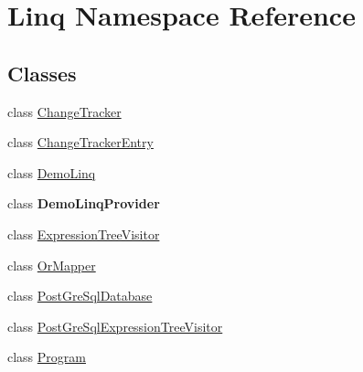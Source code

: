 \hypertarget{namespace_linq}{}\section{Linq Namespace Reference}
\label{namespace_linq}
\subsection*{Classes}
\begin{DoxyCompactItemize}
\item 
class \mbox{\hyperlink{class_linq_1_1_change_tracker}{Change\+Tracker}}
\item 
class \mbox{\hyperlink{class_linq_1_1_change_tracker_entry}{Change\+Tracker\+Entry}}
\item 
class \mbox{\hyperlink{class_linq_1_1_demo_linq}{Demo\+Linq}}
\item 
class {\bfseries Demo\+Linq\+Provider}
\item 
class \mbox{\hyperlink{class_linq_1_1_expression_tree_visitor}{Expression\+Tree\+Visitor}}
\item 
class \mbox{\hyperlink{class_linq_1_1_or_mapper}{Or\+Mapper}}
\item 
class \mbox{\hyperlink{class_linq_1_1_post_gre_sql_database}{Post\+Gre\+Sql\+Database}}
\item 
class \mbox{\hyperlink{class_linq_1_1_post_gre_sql_expression_tree_visitor}{Post\+Gre\+Sql\+Expression\+Tree\+Visitor}}
\item 
class \mbox{\hyperlink{class_linq_1_1_program}{Program}}
\end{DoxyCompactItemize}
